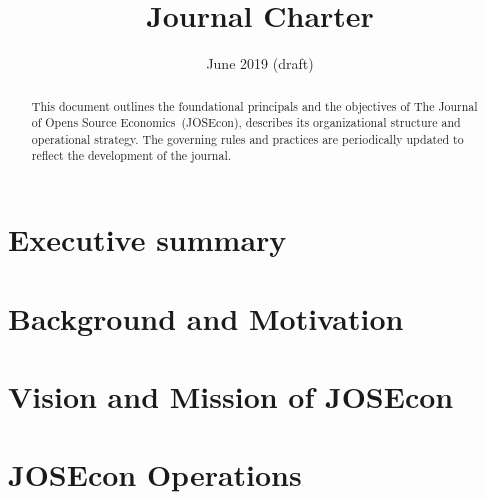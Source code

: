 \documentclass[12pt,a4paper]{article}
\begin{document}
\title{\Huge Journal Charter}
\date{June 2019 {\small(draft)}}
\maketitle
\thispagestyle{empty}
\setcounter{page}{0}
\begin{abstract}
\noindent
This document outlines the foundational principals and the objectives of 
The Journal of Opens Source Economics~(JOSEcon),
describes its organizational structure and operational strategy.
The governing rules and practices are periodically updated to reflect 
the development of the journal.
\end{abstract}
\vspace{8ex}

\setlength{\parskip}{0em}
{\singlespacing \footnotesize \tableofcontents}
\clearpage
\setlength{\parskip}{0.5em}

\section{Executive summary}


\section{Background and Motivation}


\section{Vision and Mission of JOSEcon}


\section{JOSEcon Operations}

\end{document}
